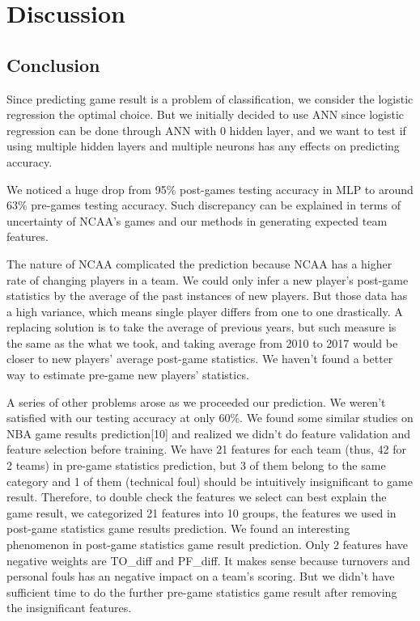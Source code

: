 \documentclass[12pt]{article}
\begin{document}
\section{Discussion} 

\subsection{Conclusion}

\quad Since predicting game result is a problem of classification, we consider the logistic regression the optimal choice. But we initially decided to use ANN since logistic regression can be done through ANN with 0 hidden layer, and we want to test if using multiple hidden layers and multiple neurons has any effects on predicting accuracy.


\quad We noticed a huge drop from 95\% post-games testing accuracy in MLP to around 63\% pre-games testing accuracy. Such discrepancy can be explained in terms of uncertainty of NCAA’s games and our methods in generating expected team features. 

\quad The nature of NCAA complicated the prediction because NCAA has a higher rate of changing players in a team. We could only infer a new player’s post-game statistics by the average of the past instances of new players. But those data has a high variance, which means single player differs from one to one drastically. A replacing solution is to take the average of previous years, but such measure is the same as the what we took, and taking average from 2010 to 2017 would be closer to new players’ average post-game statistics. We haven’t found a better way to estimate pre-game new players’ statistics.

\quad A series of other problems arose as we proceeded our prediction. We weren’t satisfied with our testing accuracy at only 60\%. We found some similar studies on NBA game results prediction[10] and realized we didn’t do feature validation and feature selection before training. We have 21 features for each team (thus, 42 for 2 teams) in pre-game statistics prediction, but 3 of them belong to the same category and 1 of them (technical foul) should be intuitively insignificant to game result. Therefore, to double check the features we select can best explain the game result, we categorized 21 features into 10 groups, the features we used in post-game statistics game results prediction. We found an interesting phenomenon in post-game statistics game result prediction. Only 2 features have negative weights are TO\_diff and PF\_diff. It makes sense because turnovers and personal fouls has an negative impact on a team’s scoring. But we didn’t have sufficient time to do the further pre-game statistics game result after removing the insignificant features. \\
\end{document}
